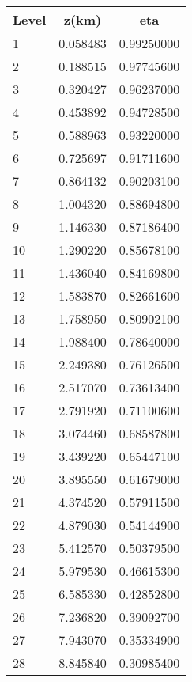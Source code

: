 \begin{table}
  \begin{tabular}{|l|c|c|}
    \hline
    Level & z(km) & eta 
    \\ \hline
    1 & 0.058483 & 0.99250000 
    \\ \hline
    2 & 0.188515 & 0.97745600 
    \\ \hline
    3 & 0.320427 & 0.96237000 
    \\ \hline
    4 & 0.453892 & 0.94728500 
    \\ \hline
    5 & 0.588963 & 0.93220000 
    \\ \hline
    6 & 0.725697 & 0.91711600 
    \\ \hline
    7 & 0.864132 & 0.90203100 
    \\ \hline
    8 & 1.004320 & 0.88694800 
    \\ \hline
    9 & 1.146330 & 0.87186400 
    \\ \hline
    10 & 1.290220 & 0.85678100 
    \\ \hline
    11 & 1.436040 & 0.84169800 
    \\ \hline
    12 & 1.583870 & 0.82661600 
    \\ \hline
    13 & 1.758950 & 0.80902100 
    \\ \hline
    14 & 1.988400 & 0.78640000 
    \\ \hline
    15 & 2.249380 & 0.76126500 
    \\ \hline
    16 & 2.517070 & 0.73613400 
    \\ \hline
    17 & 2.791920 & 0.71100600 
    \\ \hline
    18 & 3.074460 & 0.68587800 
    \\ \hline
    19 & 3.439220 & 0.65447100 
    \\ \hline
    20 & 3.895550 & 0.61679000 
    \\ \hline
    21 & 4.374520 & 0.57911500 
    \\ \hline
    22 & 4.879030 & 0.54144900 
    \\ \hline
    23 & 5.412570 & 0.50379500 
    \\ \hline
    24 & 5.979530 & 0.46615300 
    \\ \hline
    25 & 6.585330 & 0.42852800 
    \\ \hline
    26 & 7.236820 & 0.39092700 
    \\ \hline
    27 & 7.943070 & 0.35334900 
    \\ \hline
    28 & 8.845840 & 0.30985400 
    \\ \hline

\end{tabular}
\end{table}
